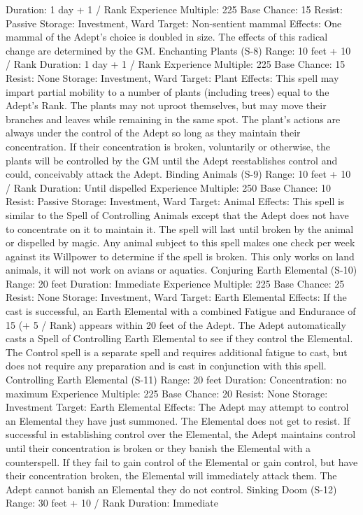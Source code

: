 \documentclass[a4paper]{article}
\begin{document}
\begin{multicols}{3}
Duration: 1 day + 1 / Rank
Experience Multiple: 225
Base Chance: 15%
Resist: Passive
Storage: Investment, Ward
Target: Non-sentient mammal
Effects: One mammal of the Adept’s choice is
doubled in size. The effects of this radical change
are determined by the GM.
Enchanting Plants (S-8)
Range: 10 feet + 10 / Rank
Duration: 1 day + 1 / Rank
Experience Multiple: 225
Base Chance: 15%
Resist: None
Storage: Investment, Ward
Target: Plant
Effects: This spell may impart partial mobility to a
number of plants (including trees) equal to the
Adept’s Rank. The plants may not uproot themselves, but may move their branches and leaves
while remaining in the same spot. The plant’s
actions are always under the control of the Adept
so long as they maintain their concentration. If
their concentration is broken, voluntarily or otherwise, the plants will be controlled by the GM until
the Adept reestablishes control and could, conceivably attack the Adept.
Binding Animals (S-9)
Range: 10 feet + 10 / Rank
Duration: Until dispelled
Experience Multiple: 250
Base Chance: 10%
Resist: Passive
Storage: Investment, Ward
Target: Animal
Effects: This spell is similar to the Spell of Controlling Animals except that the Adept does not
have to concentrate on it to maintain it. The spell
will last until broken by the animal or dispelled by
magic. Any animal subject to this spell makes one
check per week against its Willpower to determine
if the spell is broken. This only works on land
animals, it will not work on avians or aquatics.
Conjuring Earth Elemental (S-10)
Range: 20 feet
Duration: Immediate
Experience Multiple: 225
Base Chance: 25%
Resist: None
Storage: Investment, Ward
Target: Earth Elemental
Effects: If the cast is successful, an Earth Elemental with a combined Fatigue and Endurance of 15
(+ 5 / Rank) appears within 20 feet of the Adept.
The Adept automatically casts a Spell of Controlling Earth Elemental to see if they control the
Elemental. The Control spell is a separate spell and
requires additional fatigue to cast, but does not
require any preparation and is cast in conjunction
with this spell.
Controlling Earth Elemental (S-11)
Range: 20 feet
Duration: Concentration: no maximum
Experience Multiple: 225
Base Chance: 20%
Resist: None
Storage: Investment
Target: Earth Elemental
Effects: The Adept may attempt to control an Elemental they have just summoned. The Elemental
does not get to resist. If successful in establishing
control over the Elemental, the Adept maintains
control until their concentration is broken or they
banish the Elemental with a counterspell. If they
fail to gain control of the Elemental or gain control,
but have their concentration broken, the Elemental
will immediately attack them. The Adept cannot
banish an Elemental they do not control.
Sinking Doom (S-12)
Range: 30 feet + 10 / Rank
Duration: Immediate


\end{multicols}
\end{document}
